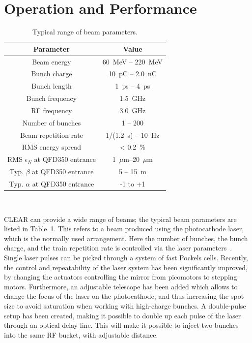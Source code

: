 \documentclass[a4paper,
               keeplastbox,   %
               ]{jacow}
\begin{document}
\section{Operation and Performance}

\begin{table}[t]
  \centering
  \caption{Typical range of beam parameters.}
  \label{tab:beamparameters}
  \begin{tabular}{c c}
    \toprule
    \textbf{Parameter} & \textbf{Value} \\
    \midrule
    Beam energy       &  60~MeV -- 220~MeV\\
    Bunch charge      &  10~pC  -- 2.0~nC \\
    Bunch length      &   1~ps  -- 4~ps \\
    Bunch frequency   &   1.5~GHz \\
    RF frequency      &   3.0~GHz \\
    Number of bunches &   1 -- 200 \\
    Beam repetition rate   & 1/(1.2~s) -- 10~Hz \\
    RMS energy spread & < 0.2~\% \\
    RMS $\epsilon_N$ at QFD350 entrance & 1~$\mu$m--20~$\mu$m\\
    Typ. $\beta$ at QFD350 entrance & 5 -- 15~m \\
    Typ. $\alpha$ at QFD350 entrance & -1 to +1 \\
    \bottomrule
  \end{tabular}
  ~\vspace{-2em} %
\end{table}

CLEAR can provide a wide range of beams; the typical beam parameters are listed in Table~\ref{tab:beamparameters}.
This refers to a beam produced using the photocathode laser, which is the normally used arrangement.
Here the number of bunches, the bunch charge, and the train repetition rate is controlled via the laser parameters~\cite{LucaGun,BrossardGun}.
Single laser pulses can be picked through a system of fast Pockels cells.
Recently, the control and repeatability of the laser system has been significantly improved, by changing the actuators controlling the mirror from picomotors to stepping motors.
Furthermore, an adjustable telescope has been added which allows to change the focus of the laser on the photocathode, and thus increasing the spot size to avoid saturation when working with high-charge bunches.
A double-pulse setup has been created, making it possible to double up each pulse of the laser through an optical delay line.
This will make it possible to inject two bunches into the same RF bucket, with adjustable distance.
\end{document}
